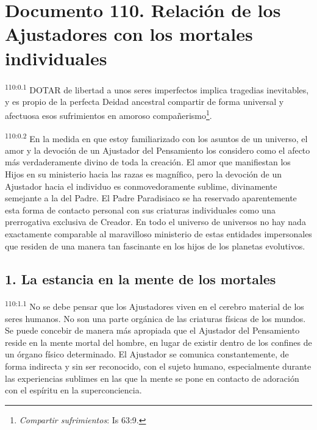 \chapter{Documento 110. Relación de los Ajustadores con los mortales individuales}
\par
\textsuperscript{110:0.1} DOTAR de libertad a unos seres imperfectos implica tragedias inevitables, y es propio de la perfecta Deidad ancestral compartir de forma universal y afectuosa esos sufrimientos en amoroso compañerismo\footnote{\textit{Compartir sufrimientos}: Is 63:9.}.

\par
\textsuperscript{110:0.2} En la medida en que estoy familiarizado con los asuntos de un universo, el amor y la devoción de un Ajustador del Pensamiento los considero como el afecto más verdaderamente divino de toda la creación. El amor que manifiestan los Hijos en su ministerio hacia las razas es magnífico, pero la devoción de un Ajustador hacia el individuo es conmovedoramente sublime, divinamente semejante a la del Padre. El Padre Paradisiaco se ha reservado aparentemente esta forma de contacto personal con sus criaturas individuales como una prerrogativa exclusiva de Creador. En todo el universo de universos no hay nada exactamente comparable al maravilloso ministerio de estas entidades impersonales que residen de una manera tan fascinante en los hijos de los planetas evolutivos.

\section*{1. La estancia en la mente de los mortales}
\par
\textsuperscript{110:1.1} No se debe pensar que los Ajustadores viven en el cerebro material de los seres humanos. No son una parte orgánica de las criaturas físicas de los mundos. Se puede concebir de manera más apropiada que el Ajustador del Pensamiento reside en la mente mortal del hombre, en lugar de existir dentro de los confines de un órgano físico determinado. El Ajustador se comunica constantemente, de forma indirecta y sin ser reconocido, con el sujeto humano, especialmente durante las experiencias sublimes en las que la mente se pone en contacto de adoración con el espíritu en la superconciencia.

